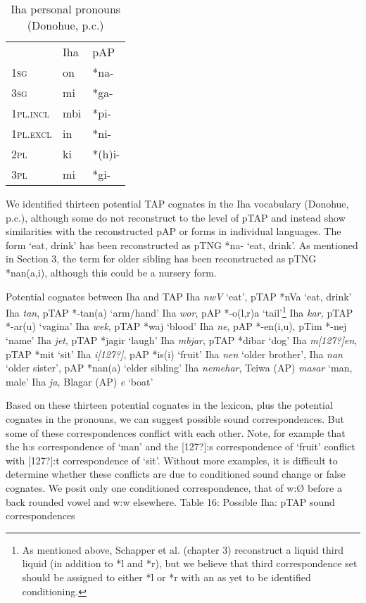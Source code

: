 \begin{table}\centering


\begin{tabular}{lll}
 &Iha&pAP\\
\textsc{1sg}&on&*na-\\
\textsc{3sg}&mi&*ga-\\
\textsc{1pl.incl}&mbi&*pi-\\
\textsc{1pl.excl}&in&*ni-\\
\textsc{2pl}&ki&*(h)i-\\
\textsc{3pl}&mi&*gi-\\

\end{tabular}

\caption{Iha personal pronouns (Donohue, p.c.)}\end{table}
We identified thirteen potential TAP cognates in the Iha vocabulary (Donohue, p.c.), although some do not reconstruct to the level of pTAP and instead show similarities with the reconstructed pAP or forms in individual languages. The form `eat, drink' has been reconstructed as pTNG *na- `eat, drink'. As mentioned in Section 3, the term for older sibling has been reconstructed as pTNG *nan(a,i), although this could be a nursery form.

\ea%
  Potential cognates between Iha and TAP
  \ea Iha \textit{nwV} `eat', pTAP *nVa `eat, drink'
  \ex Iha \textit{tan}, pTAP *-tan(a) `arm/hand'
  \ex Iha \textit{wor}, pAP *-o(l,r)a `tail'\footnote{As mentioned above,  Schapper et al. (chapter 3) reconstruct a liquid third liquid (in addition to *l and *r), but we believe that third correspondence set should be assigned to either *l or *r with an as yet to be identified conditioning. }
  \ex Iha \textit{kar, }pTAP *-ar(u) `vagina'
  \ex Iha \textit{wek}, pTAP *waj `blood'
  \ex Iha \textit{ne}, pAP *-en(i,u), pTim *-nej `name'
  \ex Iha \textit{jet}, pTAP *jagir `laugh'
  \ex Iha \textit{mbjar}, pTAP *dibar `dog'
  \ex Iha \textit{m[127?]en}, pTAP *mit `sit'
  \ex Iha \textit{i[127?]}, pAP *is(i) `fruit'
  \ex Iha \textit{nen }`older brother', Iha \textit{nan} `older sister', pAP *nan(a) `elder sibling'
  \ex Iha \textit{nemehar}, Teiwa (AP) \textit{masar }`man, male'
  \ex Iha \textit{ja, }Blagar (AP) \textit{{\textdyoghlig}}\textit{e} `boat'
  \z
\z

{
Based on these thirteen potential cognates in the lexicon, plus the potential cognates in the pronouns, we can suggest possible sound correspondences. But some of these correspondences conflict with each other. Note, for example that the h:s correspondence of `man' and the [127?]:s correspondence of `fruit' conflict with [127?]:t correspondence of `sit'. Without more examples, it is difficult to determine whether these conflicts are due to conditioned sound change or false cognates. We posit only one conditioned correspondence, that of w:{\O} before a back rounded vowel and w:w elsewhere. Table 16: Possible Iha: pTAP sound correspondences
}


